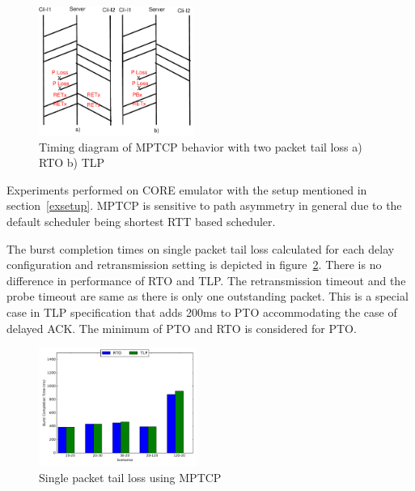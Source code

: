 \documentclass[10pt,draftcls,twocolumn]{IEEEconf}
\begin{document}
\begin{figure}[!ht]
\begin{center}
\includegraphics[angle=0, width=0.45\textwidth, natwidth=610, natheight=400]{images/timing2P.pdf}
\end{center}
\caption{Timing diagram of MPTCP behavior with two packet tail loss a) RTO b) TLP}\label{timing2P}
\end{figure}



Experiments performed on CORE emulator with the setup mentioned in section~\ref{exsetup}. MPTCP is sensitive to path asymmetry in general due to the default scheduler being shortest RTT based scheduler.

The burst completion times on single packet tail loss calculated for each delay configuration and retransmission 
setting is depicted in figure~\ref{1p}. There is no difference in performance of RTO and TLP. The retransmission
timeout and the probe timeout are same as there is only one outstanding packet. This is a special case in TLP
specification that adds 200ms to PTO accommodating the case of delayed ACK. The minimum of PTO and RTO is considered
for PTO.

\begin{figure}[!ht]
\begin{center}
\includegraphics[angle=0, width=0.46\textwidth,natwidth=578.16,natheight=433.62]{plots/1P.pdf}
\caption{Single packet tail loss using MPTCP}\label{1p}
\end{center}
\end{figure}
\end{document}
